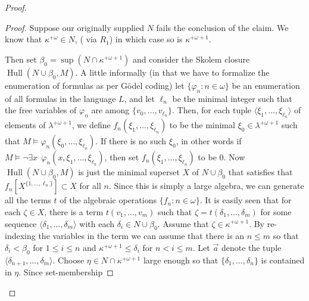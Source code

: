 \documentclass{amsart}
\theoremstyle{plain}
\theoremstyle{definition}
\theoremstyle{remark}
\theoremstyle{plain}
\theoremstyle{definition}
\theoremstyle{remark}
\begin{document}
\begin{proof}
            \begin{proof}
            Suppose  our originally supplied $N$ fails the conclusion of the
            claim.
            We   know that $\kappa^{+\omega}\in N$,
            (  via $R_1$)
            in which case so is $\kappa^{+\omega+1}$.


            Then set $\beta_0 = \sup(N\cap \kappa^{+\omega+1})$ and consider the
            Skolem closure $\mathop{Hull}(N\cup \beta_0, M)$.  A little informally
            (in that we have to formalize the enumeration of formulas as per
            G\"odel coding)
            let $\{\varphi_n : n\in \omega\}$ be an enumeration of all formulas
            in the language $L$, and let  $\ell_n$ be the minimal integer such
            that the free variables of $\varphi_n$ are among
             $\{ v_0, \ldots, v_{\ell_n}\}$.
            Then,   for each tuple
            $\langle \xi_1,\ldots, \xi_{\ell_n} \rangle$
            of elements of $\lambda^{+\omega+1}$,
             we define $f_n(\xi_1,\ldots, \xi_{\ell_n})$ to be
             the minimal $\xi_0\in \lambda^{+\omega+1}$ such that
             $M\models \varphi_n(\xi_0,\ldots, \xi_{\ell_n})$.
            If there is no such $\xi_0$,
               in other words if $M\models \lnot\exists x~~  \varphi_n(x,\xi_1,
            \ldots,\xi_{\ell_n})$, then set
             $f_n(\xi_1,\ldots, \xi_{\ell_n})$ to be $0$.
            Now $\mathop{Hull}(N\cup \beta_0,M)$ is just the minimal superset
             $X$
            of $N\cup \beta_0$ that satisfies that
             $f_n[X^{\{1,\ldots,\ell_n\}}] \subset X$ for all $n$. Since this is
             simply a large algebra, we can generate all the terms $t$ of
            the algebraic operations $\{ f_n : n\in \omega\}$.
            It is easily seen that for each $\zeta \in X$, there is a term
            $t(v_1,\ldots, v_m)$ such that $\zeta  = t(\delta_1,\ldots, \delta_m)$
             for some sequence $\langle \delta_1,\ldots, \delta_m\rangle$ with
             each $\delta_i\in  N\cup \beta_0$.
             Assume that
              $\zeta\in \kappa^{+\omega+1}$. By
              re-indexing the variables in the term we can assume
              that there is an $n\leq m$ so that
               $\delta_i  <\beta_0$ for $1\leq i\leq n$
                and $\kappa^{+\omega+1}\leq \delta_i$ for $n<i\leq m$.
                Let $\vec a $ denote
                the tuple $\langle \delta_{n+1},\ldots, \delta_m\rangle$.
              Choose $\eta\in N\cap \kappa^{+\omega+1}$ large enough so that
             $ \{  \delta_1, \ldots, \delta_n\}$ is contained in  $\eta$. Since set-membership

\end{proof}
\end{proof}
\end{document}
